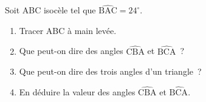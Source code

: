 \documentclass[exercice]{thedocument}%
\begin{document}
%
Soit ABC isocèle tel que $\widehat{\text{BAC}}=24^\circ$.
\begin{enumerate}
    \item Tracer ABC à main levée.
    \item Que peut-on dire des angles $\widehat{\text{CBA}}$ et $\widehat{\text{BCA}}$~?
    \item Que peut-on dire des trois angles d'un triangle~?
    \item En déduire la valeur des angles $\widehat{\text{CBA}}$ et
    $\widehat{\text{BCA}}$.
\end{enumerate}
\end{document}
